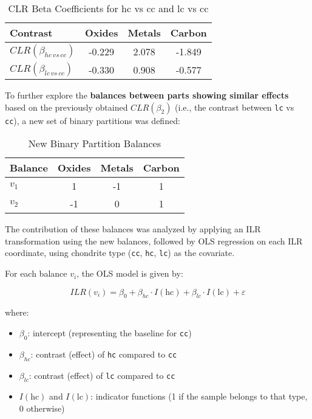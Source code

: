 \begin{table}[H]
\centering
\caption{CLR Beta Coefficients for hc vs cc and lc vs cc}
\begin{tabular}{lccc}
\toprule
\textbf{Contrast} & Oxides & Metals & Carbon \\
\midrule
$CLR(\beta_{hc \, vs \, cc})$ & -0.229 & 2.078 & -1.849 \\
$CLR(\beta_{lc \, vs \, cc})$ & -0.330 & 0.908 & -0.577 \\
\bottomrule
\end{tabular}
\end{table}

To further explore the \textbf{balances between parts showing similar effects} based on the previously obtained $CLR(\beta_2)$ (i.e., the contrast between \texttt{lc} vs \texttt{cc}), a new set of binary partitions was defined:

\begin{table}[H]
\centering
\caption{New Binary Partition Balances}
\begin{tabular}{lccc}
\toprule
\textbf{Balance} & Oxides & Metals & Carbon \\
\midrule
$v_1$ & 1 & -1 & 1 \\
$v_2$ & -1 & 0 & 1 \\
\bottomrule
\end{tabular}
\end{table}

The contribution of these balances was analyzed by applying an ILR transformation using the new balances, followed by OLS regression on each ILR coordinate, using chondrite type (\texttt{cc}, \texttt{hc}, \texttt{lc}) as the covariate.

For each balance $v_i$, the OLS model is given by:

\[
ILR(v_i) = \beta_0 + \beta_{hc} \cdot I(\text{hc}) + \beta_{lc} \cdot I(\text{lc}) + \varepsilon
\]

where:
\begin{itemize}
    \item $\beta_0$: intercept (representing the baseline for \texttt{cc})
    \item $\beta_{hc}$: contrast (effect) of \texttt{hc} compared to \texttt{cc}
    \item $\beta_{lc}$: contrast (effect) of \texttt{lc} compared to \texttt{cc}
    \item $I(\text{hc})$ and $I(\text{lc})$: indicator functions (1 if the sample belongs to that type, 0 otherwise)
\end{itemize}

